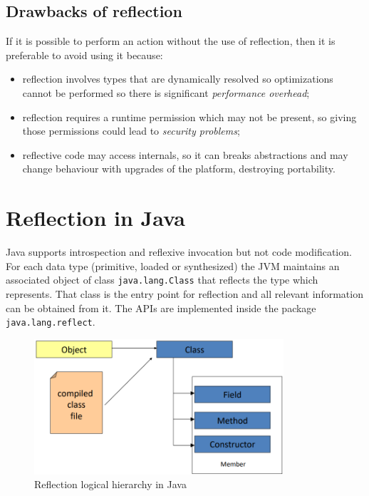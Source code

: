 \subsection{Drawbacks of reflection}
If it is possible to perform an action without the use of reflection, then it is preferable to avoid using it because:
\begin{itemize}
    \item reflection involves types that are dynamically resolved so optimizations cannot be performed so there is significant \emph{performance overhead};
    
    \item reflection requires a runtime permission which may not be present, so giving those permissions could lead to \emph{security problems};
    
    \item reflective code may access internals, so it can breaks abstractions and may change behaviour with upgrades of the platform, destroying portability.
\end{itemize}

\section{Reflection in Java}
Java supports introspection and reflexive invocation but not code modification.
For each data type (primitive, loaded or synthesized) the JVM maintains an associated object of class \verb|java.lang.Class| that reflects the type which represents.
That class is the entry point for reflection and all relevant information can be obtained from it.
The APIs are implemented inside the package \\ 
\verb|java.lang.reflect|.
\begin{figure}[H]
    \centering
    \includegraphics[width=350px]{images/4_Reflection/reflection_java.png}
    \caption{Reflection logical hierarchy in Java}
\end{figure}

